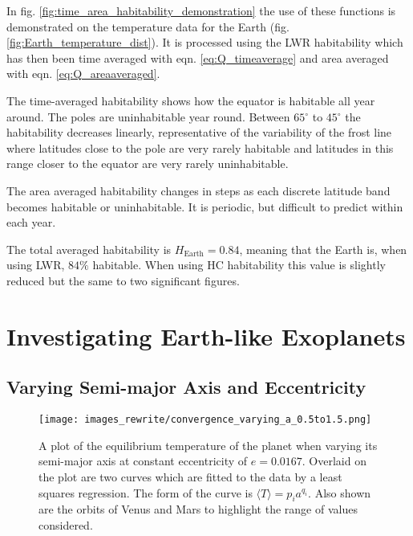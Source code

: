 \documentclass[12pt, onecolumn]{revtex4-2}    %
\newcommand{\degrees}{\ensuremath{^{\circ}}}
\begin{document}
In fig. \ref{fig:time_area_habitability_demonstration} the use of these functions is demonstrated on the temperature data for the Earth (fig. \ref{fig:Earth_temperature_dist}).
It is processed using the LWR habitability which has then been time averaged with eqn. \eqref{eq:Q_timeaverage} and area averaged with eqn. \eqref{eq:Q_areaaveraged}.

The time-averaged habitability shows how the equator is habitable all year around.
The poles are uninhabitable year round.
Between $65\degrees$ to $45\degrees$ the habitability decreases linearly, representative of the variability of the frost line where latitudes close to the pole are very rarely habitable and latitudes in this range closer to the equator are very rarely uninhabitable.

The area averaged habitability changes in steps as each discrete latitude band becomes habitable or uninhabitable.
It is periodic, but difficult to predict within each year.

The total averaged habitability is $H_\text{Earth} = 0.84$, meaning that the Earth is, when using LWR, $84\%$ habitable.
When using HC habitability this value is slightly reduced but the same to two significant figures.

\section{Investigating Earth-like Exoplanets} \label{sec:Exoplanets}
%
\subsection{Varying Semi-major Axis and Eccentricity} \label{ssec:InvTimeAveragedSolarFlux}
%
\begin{figure}[t]
  \texttt{[image: images\_rewrite/convergence\_varying\_a\_0.5to1.5.png]}
  \caption{
    A plot of the equilibrium temperature of the planet when varying its semi-major axis at constant eccentricity of $e=0.0167$.
    Overlaid on the plot are two curves which are fitted to the data by a least squares regression.
    The form of the curve is $\langle T \rangle = p_i a^{q_i}$.
    Also shown are the orbits of Venus and Mars to highlight the range of values considered.
  }
  \label{fig:planet_semimajoraxis}
\end{figure}
\end{document}
